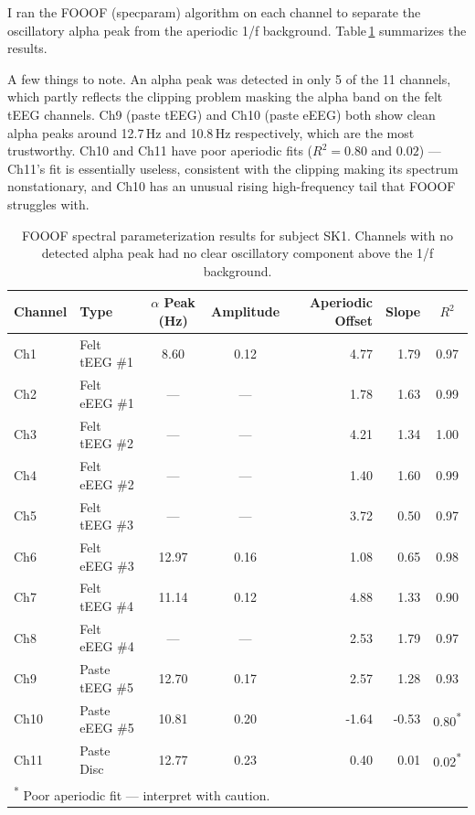 \documentclass[10pt,conference]{IEEEtran}
\begin{document}
I ran the FOOOF (specparam) algorithm on each channel to separate the
oscillatory alpha peak from the aperiodic 1/f background.
Table\,\ref{tab:fooof} summarizes the results.

A few things to note.
An alpha peak was detected in only 5 of the 11 channels, which partly
reflects the clipping problem masking the alpha band on the felt tEEG
channels.
Ch9 (paste tEEG) and Ch10 (paste eEEG) both show clean alpha peaks around
12.7\,Hz and 10.8\,Hz respectively, which are the most trustworthy.
Ch10 and Ch11 have poor aperiodic fits ($R^{2} = 0.80$ and $0.02$) ---
Ch11's fit is essentially useless, consistent with the clipping making its
spectrum nonstationary, and Ch10 has an unusual rising high-frequency tail
that FOOOF struggles with.

\begin{table}[t]
  \centering
  \caption{FOOOF spectral parameterization results for subject SK1.
    Channels with no detected alpha peak had no clear oscillatory
    component above the 1/f background.}
  \label{tab:fooof}
  \renewcommand{\arraystretch}{1.2}
  \begin{tabular}{llccrrc}
    \toprule
    \textbf{Channel} & \textbf{Type} &
    \textbf{$\alpha$ Peak (Hz)} & \textbf{Amplitude} &
    \textbf{Aperiodic Offset} & \textbf{Slope} &
    \textbf{$R^{2}$} \\
    \midrule
    Ch1  & Felt tEEG \#1  &  8.60 & 0.12 &  4.77 &  1.79 & 0.97 \\
    Ch2  & Felt eEEG \#1  & ---   & ---  &  1.78 &  1.63 & 0.99 \\
    Ch3  & Felt tEEG \#2  & ---   & ---  &  4.21 &  1.34 & 1.00 \\
    Ch4  & Felt eEEG \#2  & ---   & ---  &  1.40 &  1.60 & 0.99 \\
    Ch5  & Felt tEEG \#3  & ---   & ---  &  3.72 &  0.50 & 0.97 \\
    Ch6  & Felt eEEG \#3  & 12.97 & 0.16 &  1.08 &  0.65 & 0.98 \\
    Ch7  & Felt tEEG \#4  & 11.14 & 0.12 &  4.88 &  1.33 & 0.90 \\
    Ch8  & Felt eEEG \#4  & ---   & ---  &  2.53 &  1.79 & 0.97 \\
    Ch9  & Paste tEEG \#5 & 12.70 & 0.17 &  2.57 &  1.28 & 0.93 \\
    Ch10 & Paste eEEG \#5 & 10.81 & 0.20 & -1.64 & -0.53 & 0.80\textsuperscript{*} \\
    Ch11 & Paste Disc     & 12.77 & 0.23 &  0.40 &  0.01 & 0.02\textsuperscript{*} \\
    \bottomrule
    \multicolumn{7}{l}{\small \textsuperscript{*} Poor aperiodic fit --- interpret with caution.}
  \end{tabular}
\end{table}
\end{document}

